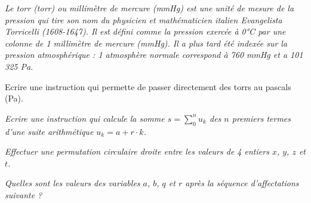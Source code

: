 
\begin{td}\label{td:torr}
\em
Le torr (torr) ou millimètre de mercure (mmHg) est une unité de mesure 
de la pression qui tire son nom du physicien et mathématicien italien Evangelista Torricelli (1608-1647).
Il est défini comme la pression exercée à 0°C par une colonne de 1 millimètre de mercure (mmHg).
Il a plus tard été indexée sur la pression atmosphérique : 1 atmosphère normale correspond à 
760 mmHg et a 101 325 Pa.

Ecrire une instruction qui permette de passer directement des torrs au pascals (Pa).
\end{td}

	\begin{td}\label{td:suiteArit}
\em
	Ecrire une instruction qui calcule la somme $s = \sum_0^n u_k$ des $n$ premiers 
	termes d'une suite arithmétique $u_k = a + r\cdot k$. 
	\end{td}

\begin{td}\label{td:permutation1}
\em
Effectuer une permutation circulaire droite entre les valeurs de 4 entiers $x$, $y$, $z$ et $t$.
\end{td}

\begin{td}\label{td:seq1}
\em
Quelles sont les valeurs des variables $a$, $b$, $q$ et $r$ 
après la séquence d'affectations suivante ?
	
\end{td}

